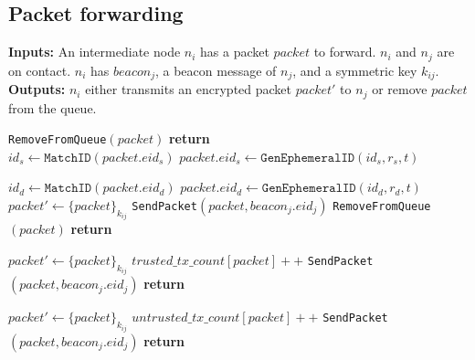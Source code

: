 \documentclass[11pt]{article}
\begin{document}
\subsection{Packet forwarding}
\begin{framed}
\noindent
\textbf{Inputs:} An intermediate node $n_i$ has a packet $packet$ to forward. $n_i$ and $n_j$ are on contact.  $n_i$ has $beacon_j$, a beacon message of $n_j$, and a symmetric key $k_{ij}$.	\\

\noindent
\textbf{Outputs:} $n_i$ either transmits an encrypted packet $packet'$ to $n_j$ or remove $packet$ from the queue.\\

\begin{algorithmic}[1]
      \State \texttt{RemoveFromQueue}$(packet)$
  	  \State \textbf{return}
    \EndIf	\\


        \State $id_s \leftarrow \texttt{MatchID}(packet.eid_s)$      
        \State $packet.eid_s \leftarrow \texttt{GenEphemeralID}(id_s, r_s, t) $
      \EndIf     

        \State $id_d \leftarrow \texttt{MatchID}(packet.eid_d)$      
        \State $packet.eid_d \leftarrow \texttt{GenEphemeralID}(id_d, r_d, t) $
      \EndIf     
    \EndIf	\\
    
      \State $packet' \leftarrow \{packet\}_{k_{ij}}$
      \State \texttt{SendPacket}$(packet, beacon_j.eid_j)$
      \State \texttt{RemoveFromQueue}$(packet)$
      \State \textbf{return}

      \State $packet' \leftarrow \{packet\}_{k_{ij}}$
      \State $trusted\_tx\_count[packet]++$
      \State \texttt{SendPacket}$(packet, beacon_j.eid_j)$
      \State \textbf{return}

        \State $packet' \leftarrow \{packet\}_{k_{ij}}$
        \State $untrusted\_tx\_count[packet]++$
        \State \texttt{SendPacket}$(packet, beacon_j.eid_j)$
        \State \textbf{return}
      \EndIf
    \EndIf
    

\end{algorithmic}
\end{framed}
\end{document}
